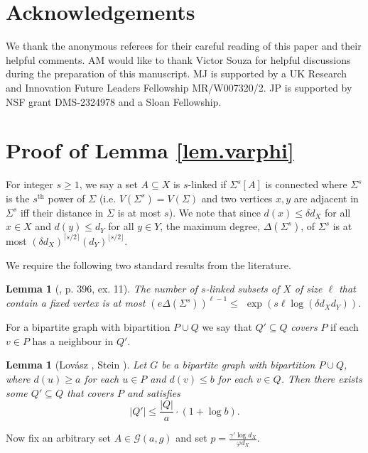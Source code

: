 \documentclass[a4paper]{amsart}
\newtheorem{lem}[thm]{Lemma}
\theoremstyle{definition}
\newcommand{\gd}[0]{\delta }
\newcommand{\sub}[0]{\subseteq}
\newcommand{\0}[0]{\emptyset}
\begin{document}
\section*{Acknowledgements}
We thank the anonymous referees for their careful reading of this paper and their helpful comments. AM would like to thank Victor Souza for helpful discussions during the preparation of this manuscript.  MJ is supported by a UK Research and Innovation Future Leaders Fellowship MR/W007320/2. JP is supported by NSF grant DMS-2324978 and a Sloan Fellowship.




\appendix
\section{Proof of Lemma \ref{lem.varphi}}\label{app:varphi}

For integer $s\geq 1$, we say a set $A\subseteq X$ is $s$-linked if $\Sigma^s[A]$ is connected where $\Sigma^s$ is the $s^{\text{th}}$ power of $\Sigma$ (i.e. $V(\Sigma^s)=V(\Sigma)$ and two vertices $x,y$ are adjacent in $\Sigma^s$ iff their distance in $\Sigma$ is at most $s$). We note that since $d(x)\leq \delta d_X$ for all $x\in X$ and $d(y)\leq d_Y$ for all $y\in Y$, the maximum degree, $\Delta(\Sigma^s)$, of $\Sigma^s$ is at most $(\gd d_X)^{\lceil s/2 \rceil}(d_Y)^{\lfloor s/2 \rfloor}$.

We require the following two standard results from the literature.

\begin{lem}[\cite{knuth}, p. 396, ex. 11]\label{linked}
    The number of $s$-linked subsets of $X$ of size $\ell$ that contain a fixed vertex is at most $(e \Delta(\Sigma^s))^{\ell-1} \le $ $\exp(s\ell\log(\delta d_Xd_Y))$.
\end{lem}

For a bipartite graph with bipartition $P \cup Q$ we say that $Q'\sub Q$ \emph{covers} $P$ if each $v\in P$ has a neighbour in $Q'$.

\begin{lem}[Lov\'asz \cite{Lov75}, Stein \cite{Ste74}]\label{lem.LS} Let $G$ be a bipartite graph with bipartition $P \cup Q$, where $d(u)\ge a$ for each $u \in P$ and $d(v)\le b$ for each $v \in Q$. Then there exists some $Q' \sub Q$ that covers $P$ and satisfies
\[|Q'|\le\frac{|Q|}{a}\cdot(1+\log b).\]
\end{lem}

Now fix an arbitrary set $A\in \mathcal{G}(a,g)$ and set $p=\frac{\gamma'\log d_X}{\varphi d_X}$.
\end{document}
